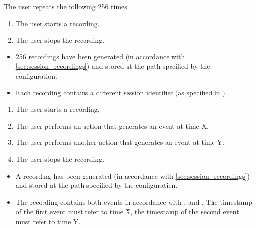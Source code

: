 \begin{tests}
    {The \gls{user} repeats the following 256 times:
    \begin{enumerate}
        \item The \gls{user} starts a recording.
        \item The \gls{user} stops the recording.
    \end{enumerate}}
    {\begin{itemize}
        \item 256 recordings have been generated (in accordance with \ref{sec:session_recordings}) and stored at the path specified by the configuration.
        \item Each recording contains a different session identifier (as specified in ).
    \end{itemize}}

    {\begin{enumerate}
        \item The \gls{user} starts a recording.
        \item The \gls{user} performs an action that generates an \gls{event} at time X.
        \item The \gls{user} performs another action that generates an \gls{event} at time Y.
        \item The \gls{user} stops the recording.
    \end{enumerate}}
    {\begin{itemize}
        \item A recording has been generated (in accordance with \ref{sec:session_recordings}) and stored at the path specified by the configuration.
        \item The recording contains both events in accordance with ,  and . The timestamp of the first event must refer to time X, the timestamp of the second event must refer to time Y.
    \end{itemize}}


\end{tests}
